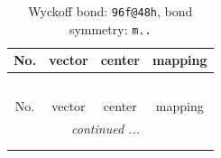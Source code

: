 \documentclass[fleqn,8pt]{jsarticle}
\begin{document}
\renewcommand{\arraystretch}{1.2}
\begin{longtable}{cccc}
\caption{Wyckoff bond: {\tt 96f@48h}, bond symmetry: {\tt m..}}
 \\
 \hline \hline
No. & vector & center & mapping \\ \hline \endfirsthead

\multicolumn{3}{l}{\tablename\ \thetable{}} \\
 \hline \hline
No. & vector & center & mapping \\ \hline \endhead

 \hline \hline
\multicolumn{3}{r}{\footnotesize\it continued ...} \\ \endfoot

 \hline \hline
\multicolumn{3}{r}{} \\ \endlastfoot


\end{longtable}
\end{document}
